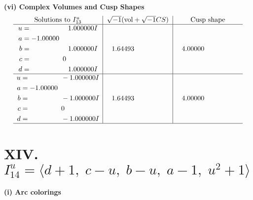 \documentclass[1p]{elsarticle_modified}
\theoremstyle{definition}
\newcommand{\I}{\sqrt{-1}}
\begin{document}
\newpage\flushleft \textbf{(vi) Complex Volumes and Cusp Shapes}
$$\begin{array}{c|c|c}  
\text{Solutions to }I^u_{13}& \I (\text{vol} + \sqrt{-1}CS) & \text{Cusp shape}\\
 \hline 
\begin{aligned}
u &= \phantom{-0.000000 -}1.000000 I \\
a &= -1.00000\phantom{ +0.000000I} \\
b &= \phantom{-0.000000 -}1.000000 I \\
c &= \phantom{-0.000000 } 0 \\
d &= \phantom{-0.000000 -}1.000000 I\end{aligned}
 & \phantom{-}1.64493\phantom{ +0.000000I} & \phantom{-}4.00000\phantom{ +0.000000I} \\ \hline\begin{aligned}
u &= \phantom{-0.000000 } -1.000000 I \\
a &= -1.00000\phantom{ +0.000000I} \\
b &= \phantom{-0.000000 } -1.000000 I \\
c &= \phantom{-0.000000 } 0 \\
d &= \phantom{-0.000000 } -1.000000 I\end{aligned}
 & \phantom{-}1.64493\phantom{ +0.000000I} & \phantom{-}4.00000\phantom{ +0.000000I}\\
 \hline 
 \end{array}$$\newpage\newpage\renewcommand{\arraystretch}{1}
\centering \section*{XIV. $I^u_{14}= \langle d+1,\;c- u,\;b- u,\;a-1,\;u^2+1 \rangle$}
\flushleft \textbf{(i) Arc colorings}\\
\end{document}
